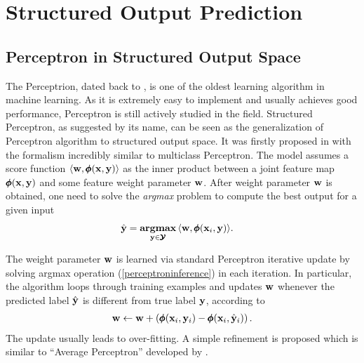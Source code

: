 {%
%
%
\chapter{Structured Output Prediction} \label{ch_multi}


%
%
\section{Perceptron in Structured Output Space}

The Perceptrion, dated back to \citep{Rosenblatt58}, is one of the oldest learning algorithm in machine learning.
As it is extremely easy to implement and usually achieves good performance, Perceptron is still actively studied in the field.
Structured Perceptron, as suggested by its name, can be seen as the generalization of Perceptron algorithm to structured output space.
It was firstly proposed in \citep{collins02a, collins02b} with the formalism incredibly similar to multiclass Perceptron. 
The model assumes a score function $\langle \mathbf {w}, \pmb \phi(\mathbf {x},\mathbf {y}) \rangle$ as the inner product between a joint feature map $\pmb \phi(\mathbf {x},\mathbf {y})$ and some feature weight parameter $\mathbf {w}$.
After weight parameter $\mathbf {w}$ is obtained, one need to solve the \textit{argmax} problem to compute the best output for a given input
\begin{align}
	\hat{\mathbf {y}} = \underset{\mathbf {y}\in\pmb {\mathcal{Y}}}{\textbf{argmax}} &\, \langle \mathbf {w}, \pmb \phi(\mathbf {x}_i,\mathbf {y}) \rangle.  \label{perceptroninference}
\end{align}

The weight parameter $\mathbf {w}$ is learned via standard Perceptron iterative update by solving argmax operation (\ref{perceptroninference}) in each iteration.
In particular, the algorithm loops through training examples and updates $\mathbf {w}$ whenever the predicted label $\hat{\mathbf {y}}$ is different from true label $\mathbf {y}$, according to 
\begin{align*}
	\mathbf {w} \leftarrow \mathbf {w} + \left(\pmb \phi(\mathbf {x}_i,\mathbf {y}_i) - \pmb \phi(\mathbf {x}_i,\hat{\mathbf {y}}_i)\right).
\end{align*}
The update usually leads to over-fitting.
A simple refinement is proposed which is similar to ``Average Perceptron'' developed by \citet{Freund99large}.

}
